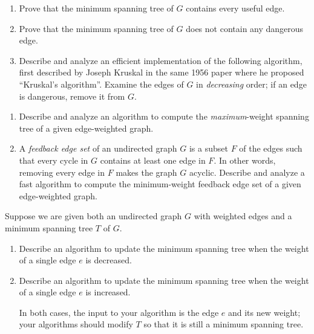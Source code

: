 \begin{exercises}
\begin{enumerate}
\item Prove that the minimum spanning tree of $G$ contains every useful edge.

\item Prove that the minimum spanning tree of $G$ does not contain any dangerous edge.

\item Describe and analyze an efficient implementation of the following algorithm, first described by Joseph Kruskal in the same 1956 paper where he proposed “Kruskal’s algorithm”. Examine the edges of $G$ in \textit{decreasing} order; if an edge is dangerous, remove it from $G$. 

\end{enumerate}

\item
\begin{enumerate}
\item Describe and analyze an algorithm to compute the \textit{maximum}-weight spanning tree of a given edge-weighted graph.
\item A \textit{feedback edge set} of an undirected graph $G$ is a subset $F$ of the edges such that every cycle in $G$ contains at least one edge in $F$. In other words, removing every edge in $F$ makes the graph $G$ acyclic. Describe and analyze a fast algorithm to compute the minimum-weight feedback edge set of a given edge-weighted graph.

\end{enumerate}

\item Suppose we are given both an undirected graph $G$ with weighted edges and a minimum spanning tree $T$ of $G$.

\begin{enumerate}
\item Describe an algorithm to update the minimum spanning tree when the weight of a single edge $e$ is decreased.

\item Describe an algorithm to update the minimum spanning tree when the weight of a single edge $e$ is increased.

\noindent In both cases, the input to your algorithm is the edge $e$ and its new weight; your algorithms should modify $T$ so that it is still a minimum spanning tree. 


\end{enumerate}
\end{exercises}
